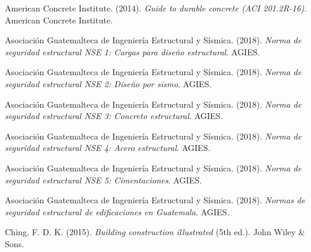 \documentclass[14pt,letterpaper]{extarticle}
\begin{document}
American Concrete Institute. (2014). \textit{Guide to durable concrete (ACI 201.2R-16)}. American Concrete Institute.

Asociación Guatemalteca de Ingeniería Estructural y Sísmica. (2018). \textit{Norma de seguridad estructural NSE 1: Cargas para diseño estructural}. AGIES.

Asociación Guatemalteca de Ingeniería Estructural y Sísmica. (2018). \textit{Norma de seguridad estructural NSE 2: Diseño por sismo}. AGIES.

Asociación Guatemalteca de Ingeniería Estructural y Sísmica. (2018). \textit{Norma de seguridad estructural NSE 3: Concreto estructural}. AGIES.

Asociación Guatemalteca de Ingeniería Estructural y Sísmica. (2018). \textit{Norma de seguridad estructural NSE 4: Acero estructural}. AGIES.

Asociación Guatemalteca de Ingeniería Estructural y Sísmica. (2018). \textit{Norma de seguridad estructural NSE 5: Cimentaciones}. AGIES.

Asociación Guatemalteca de Ingeniería Estructural y Sísmica. (2018). \textit{Normas de seguridad estructural de edificaciones en Guatemala}. AGIES.

Ching, F. D. K. (2015). \textit{Building construction illustrated} (5th ed.). John Wiley \& Sons.

	
	
	
		
	
		
	
	
	
\end{document}
